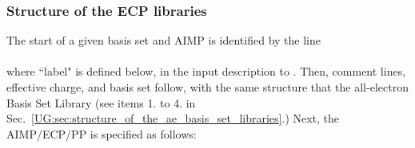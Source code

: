 \subsubsection{Structure of the ECP libraries}
\label{UG:sec:structure_of_the_ecp_libraries}
 
The start of a given basis set and AIMP is identified by the line
\\[.1in]  \\[.1in]
\noindent where ``label" is defined below,
in the input description to .
Then, comment lines, effective charge, and basis set follow,
with the same structure that the all-electron Basis Set Library
(see items 1. to 4. in Sec.~\ref{UG:sec:structure_of_the_ae_basis_set_libraries}.)
Next, the AIMP/ECP/PP is specified as follows:
